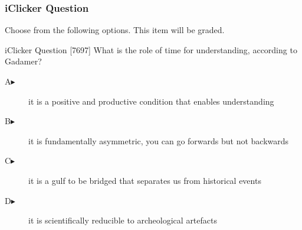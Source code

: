 \begin{frame}
  \frametitle{iClicker Question}
Choose from the following options. This item will be graded.
\begin{block}{iClicker Question}
[7697] What is the role of time for understanding, according to Gadamer?
\end{block}
\begin{description}
\item[A\hspace{.2in}$\blacktriangleright$] it is a positive and productive condition that enables understanding
\item[B\hspace{.2in}$\blacktriangleright$] it is fundamentally asymmetric, you can go forwards but not backwards
\item[C\hspace{.2in}$\blacktriangleright$] it is a gulf to be bridged that separates us from historical events
\item[D\hspace{.2in}$\blacktriangleright$] it is scientifically reducible to archeological artefacts
\end{description}
\end{frame}
